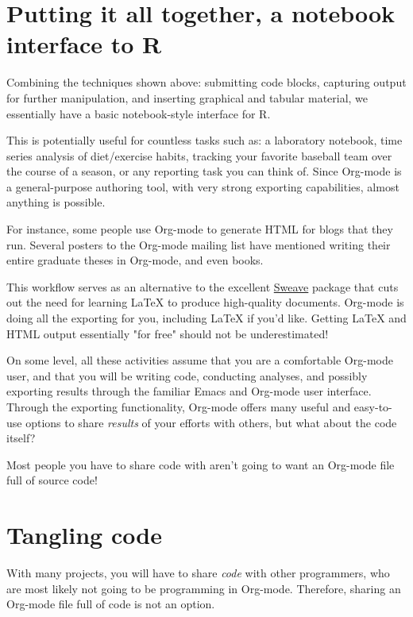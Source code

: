 \documentclass[11pt]{article}
\begin{document}
\section*{Putting it all together, a notebook interface to R}
\label{sec-7}

Combining the techniques shown above: submitting code blocks, capturing output for further manipulation, and inserting graphical and tabular material, we essentially have a basic notebook-style interface for R.

This is potentially useful for countless tasks such as: a laboratory notebook, time series analysis of diet/exercise habits, tracking your favorite baseball team over the course of a season, or any reporting task you can think of. Since Org-mode is a general-purpose authoring tool, with very strong exporting capabilities, almost anything is possible.

For instance, some people use Org-mode to generate HTML for blogs that they run. Several posters to the Org-mode mailing list have mentioned writing their entire graduate theses in Org-mode, and even books.

This workflow serves as an alternative to the excellent \href{http://www.stat.uni-muenchen.de/~leisch/Sweave/}{Sweave} package that cuts out the need for learning \LaTeX{} to produce high-quality documents. Org-mode is doing all the exporting for you, including \LaTeX{} if you'd like. Getting \LaTeX{} and HTML output essentially "for free" should not be underestimated!

On some level, all these activities assume that you are a comfortable Org-mode user, and that you will be writing code, conducting analyses, and possibly exporting results through the familiar Emacs and Org-mode user interface. Through the exporting functionality, Org-mode offers many useful and easy-to-use options to share \emph{results} of your efforts with others, but what about the code itself? 

Most people you have to share code with aren't going to want an Org-mode file full of source code!
\section*{Tangling code}
\label{sec-8}

With many projects, you will have to share \emph{code} with other programmers, who are most likely not going to be programming in Org-mode. Therefore, sharing an Org-mode file full of code is not an option.
\end{document}
